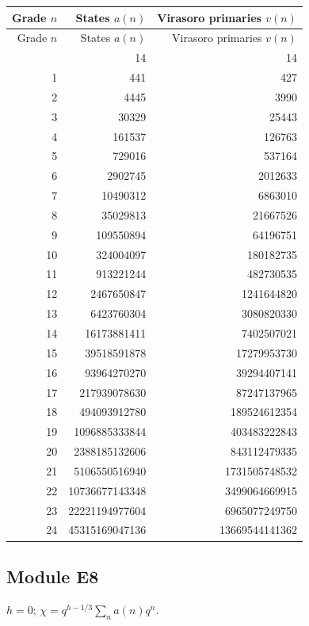 \begingroup\small
\setlength{\tabcolsep}{5pt}
\begin{longtable}{@{}rrr@{}}
\toprule
Grade $n$ & States $a(n)$ & Virasoro primaries $v(n)$\\
\midrule\endfirsthead
\toprule
Grade $n$ & States $a(n)$ & Virasoro primaries $v(n)$\\
\midrule\endhead
\bottomrule\endfoot
0 & 14 & 14\\
1 & 441 & 427\\
2 & 4445 & 3990\\
3 & 30329 & 25443\\
4 & 161537 & 126763\\
5 & 729016 & 537164\\
6 & 2902745 & 2012633\\
7 & 10490312 & 6863010\\
8 & 35029813 & 21667526\\
9 & 109550894 & 64196751\\
10 & 324004097 & 180182735\\
11 & 913221244 & 482730535\\
12 & 2467650847 & 1241644820\\
13 & 6423760304 & 3080820330\\
14 & 16173881411 & 7402507021\\
15 & 39518591878 & 17279953730\\
16 & 93964270270 & 39294407141\\
17 & 217939078630 & 87247137965\\
18 & 494093912780 & 189524612354\\
19 & 1096885333844 & 403483222843\\
20 & 2388185132606 & 843112479335\\
21 & 5106550516940 & 1731505748532\\
22 & 10736677143348 & 3499064669915\\
23 & 22221194977604 & 6965077249750\\
24 & 45315169047136 & 13669544141362\\
\end{longtable}
\endgroup

\subsection{Module E8}
$h=0$; $\chi=q^{h-1/3}\sum_n a(n)q^n$.

